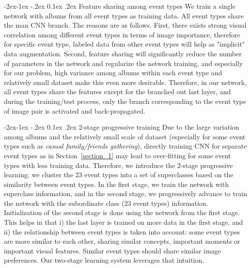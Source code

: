 \documentclass[10pt,twocolumn,letterpaper]{article}
\makeatletter
\renewcommand\subsubsection{\@startsection{subsubsection}{3}{\z@}%
                {-2ex\@plus -1ex \@minus -.2ex}%
                {0.1ex \@plus .2ex}%
                {\normalfont\normalsize\bfseries}}
\makeatother
\begin{document}
\subsubsection{Feature sharing among event types}  
\label{section_1}
We train a single network with albums from all event types as training data. All event types share the man CNN branch. The reasons are as follows. First, there exists strong visual correlation among different event types in terms of image importance, therefore for specific event type, labeled data from other event types will help as "implicit" data augmentation. Second, feature sharing will significantly reduce the number of parameters in the network and regularize the network training, and especially for our problem, high variance among albums within each event type and relatively small dataset make this even more desirable. Therefore, in our network, all event types share the features except for the branched out last layer, and during the training/test process, only the branch corresponding to the event type of image pair is activated and back-propagated.

\subsubsection{2-stage progressive training} 
Due to the large variation among albums and the relatively small scale of dataset (especially for some event types such as \textit{casual family/friends gathering}), directly training CNN for separate event types as in Section~\ref{section_1} may lead to over-fitting for some event types with less training data. Therefore, we introduce the 2-stage progressive learning: we cluster the 23 event types into a set of superclasses based on the similarity between event types. In the first stage, we train the network with superclass information, and in the second stage, we progressively advance to train the network with the subordinate class (23 event types) information. Initialization of the second stage is done using the network from the first stage. This helps in that i) the last layer is trained on more data in the first stage, and ii) the relationship between event types is taken into account: some event types are more similar to each other, sharing similar concepts, important moments or important visual features. Similar event types should share similar image preferences. Our two-stage learning system leverages that intuition. %
\end{document}
